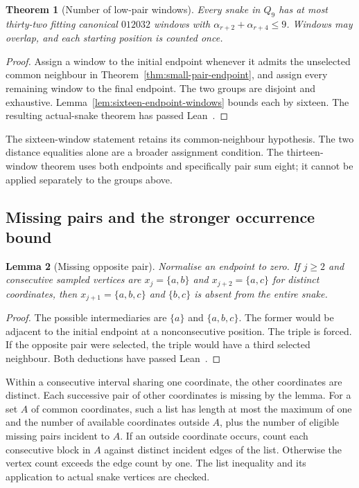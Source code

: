 \documentclass[11pt,a4paper]{article}
\newtheorem{theorem}{Theorem}[section]
\newtheorem{lemma}[theorem]{Lemma}
\theoremstyle{definition}
\theoremstyle{remark}
\newcommand{\Q}{Q}
\begin{document}
\begin{theorem}[Number of low-pair windows]\label{thm:thirty-two-windows}
Every snake in $\Q_9$ has at most thirty-two fitting canonical $012032$
windows with $\alpha_{r+2}+\alpha_{r+4}\le9$. Windows may overlap, and
each starting position is counted once.
\end{theorem}
\begin{proof}
Assign a window to the initial endpoint whenever it admits the unselected
common neighbour in Theorem~\ref{thm:small-pair-endpoint}, and assign every
remaining window to the final endpoint. The two groups are disjoint and
exhaustive. Lemma~\ref{lem:sixteen-endpoint-windows} bounds each by sixteen.
The resulting actual-snake theorem has passed Lean~\cite{occurrencearchive}.
\end{proof}
The sixteen-window statement retains its common-neighbour hypothesis. The
two distance equalities alone are a broader assignment condition. The
thirteen-window theorem uses both endpoints and specifically pair sum eight;
it cannot be applied separately to the groups above.

\subsection{Missing pairs and the stronger occurrence bound}\label{sec:missing-pair-occurrences}
\begin{lemma}[Missing opposite pair]\label{lem:missing-opposite-pair}
Normalise an endpoint to zero. If $j\ge2$ and consecutive sampled vertices
are $x_j=\{a,b\}$ and $x_{j+2}=\{a,c\}$ for distinct coordinates, then
$x_{j+1}=\{a,b,c\}$ and $\{b,c\}$ is absent from the entire snake.
\end{lemma}
\begin{proof}
The possible intermediaries are $\{a\}$ and $\{a,b,c\}$. The former would
be adjacent to the initial endpoint at a nonconsecutive position. The triple
is forced. If the opposite pair were selected, the triple would have a third
selected neighbour. Both deductions have passed Lean~\cite{occurrencearchive}.
\end{proof}

Within a consecutive interval sharing one coordinate, the other coordinates
are distinct. Each successive pair of other coordinates is missing by the
lemma. For a set $A$ of common coordinates, such a list has length at most
the maximum of one and the number of available coordinates outside $A$, plus
the number of eligible missing pairs incident to $A$. If an outside coordinate
occurs, count each consecutive block in $A$ against distinct incident edges
of the list. Otherwise the vertex count exceeds the edge count by one.
The list inequality and its application to actual snake vertices are checked.
\end{document}
